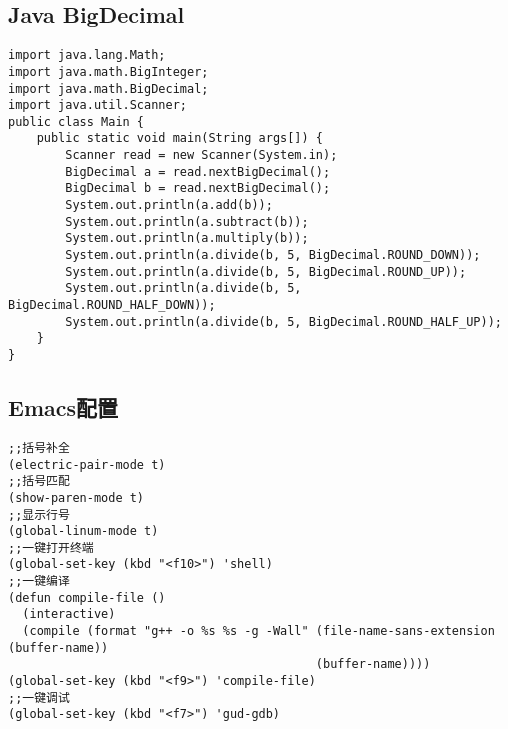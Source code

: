 ﻿\documentclass[a4paper]{article}
\begin{document}
\subsection{Java BigDecimal}
\begin{lstlisting}
import java.lang.Math;
import java.math.BigInteger;
import java.math.BigDecimal;
import java.util.Scanner;
public class Main {
    public static void main(String args[]) {
        Scanner read = new Scanner(System.in);
        BigDecimal a = read.nextBigDecimal();
        BigDecimal b = read.nextBigDecimal();
        System.out.println(a.add(b));
        System.out.println(a.subtract(b));
        System.out.println(a.multiply(b));
        System.out.println(a.divide(b, 5, BigDecimal.ROUND_DOWN));
        System.out.println(a.divide(b, 5, BigDecimal.ROUND_UP));
        System.out.println(a.divide(b, 5, BigDecimal.ROUND_HALF_DOWN));
        System.out.println(a.divide(b, 5, BigDecimal.ROUND_HALF_UP));
    }
}
\end{lstlisting}
\subsection{Emacs配置}
\begin{lstlisting}
;;括号补全
(electric-pair-mode t)
;;括号匹配
(show-paren-mode t)
;;显示行号
(global-linum-mode t)
;;一键打开终端
(global-set-key (kbd "<f10>") 'shell)
;;一键编译
(defun compile-file ()
  (interactive)
  (compile (format "g++ -o %s %s -g -Wall" (file-name-sans-extension (buffer-name)) 
                                           (buffer-name))))
(global-set-key (kbd "<f9>") 'compile-file)
;;一键调试
(global-set-key (kbd "<f7>") 'gud-gdb)
\end{lstlisting}
\end{document}
